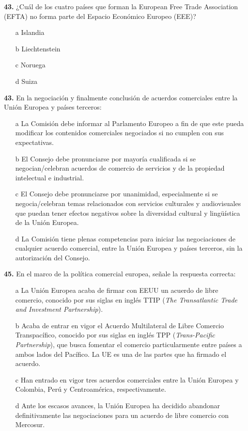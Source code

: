 \documentclass{nuevotema}
\begin{document}

\textbf{43.} ¿Cuál de los cuatro países que forman la European Free Trade Association (EFTA) no forma parte del Espacio Económico Europeo (EEE)?

\begin{itemize}
	\item[a] Islandia
	\item[b] Liechtenstein
	\item[c] Noruega
	\item[d] Suiza
\end{itemize}

\textbf{43.} En la negociación y finalmente conclusión de acuerdos comerciales entre la Unión Europea y países terceros:

\begin{itemize}
	\item[a] La Comisión debe informar al Parlamento Europeo a fin de que este pueda modificar los contenidos comerciales negociados si no cumplen con sus expectativas.
	\item[b] El Consejo debe pronunciarse por mayoría cualificada si se negocian/celebran acuerdos de comercio de servicios y de la propiedad intelectual e industrial.
	\item[c] El Consejo debe pronunciarse por unanimidad, especialmente si se negocia/celebran temas relacionados con servicios culturales y audiovisuales que puedan tener efectos negativos sobre la diversidad cultural y lingüística de la Unión Europea. 
	\item[d] La Comisión tiene plenas competencias para iniciar las negociaciones de cualquier acuerdo comercial, entre la Unión Europea y países terceros, sin la autorización del Consejo.
\end{itemize}

\textbf{45.} En el marco de la política comercial europea, señale la respuesta correcta:
\begin{itemize}
	\item[a] La Unión Europea acaba de firmar con EEUU un acuerdo de libre comercio, conocido por sus siglas en inglés TTIP (\textit{The Transatlantic Trade and Investment Partnership}).
	\item[b] Acaba de entrar en vigor el Acuerdo Multilateral de Libre Comercio Transpacífico, conocido por sus siglas en inglés TPP (\textit{Trans-Pacific Partnership}), que busca fomentar el comercio particularmente entre países a ambos lados del Pacífico. La UE es una de las partes que ha firmado el acuerdo.
	\item[c] Han entrado en vigor tres acuerdos comerciales entre la Unión Europea y Colombia, Perú y Centroamérica, respectivamente.
	\item[d] Ante los escasos avances, la Unión Europea ha decidido abandonar definitivamente las negociaciones para un acuerdo de libre comercio con Mercosur.
\end{itemize}
\end{document}
